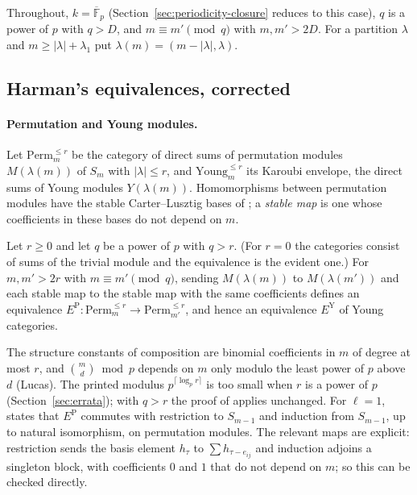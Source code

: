 Throughout, $k=\overline{\mathbb F}_p$ (Section~\ref{sec:periodicity-closure} reduces to this
case), $q$ is a power of $p$ with $q>D$, and $m\equiv m'\pmod q$ with $m,m'>2D$.  For a
partition $\lambda$ and $m\ge|\lambda|+\lambda_1$ put $\lambda(m)=(m-|\lambda|,\lambda)$.

\subsection{Harman's equivalences, corrected}\label{app:harman}

\paragraph{Permutation and Young modules.}  Let $\mathrm{Perm}^{\le r}_m$ be the category of
direct sums of permutation modules $M(\lambda(m))$ of $S_m$ with $|\lambda|\le r$, and
$\mathrm{Young}^{\le r}_m$ its Karoubi envelope, the direct sums of Young modules
$Y(\lambda(m))$.  Homomorphisms between permutation modules have the stable Carter--Lusztig
bases of \cite[\S2]{harman2015}; a \emph{stable map} is one whose coefficients in these bases do
not depend on $m$.

\begin{theorem}\label{thm:harman25}
Let $r\ge0$ and let $q$ be a power of $p$ with $q>r$.  (For $r=0$ the categories consist of
sums of the trivial module and the equivalence is the evident one.)  For $m,m'>2r$ with $m\equiv m'\pmod q$,
sending $M(\lambda(m))$ to $M(\lambda(m'))$ and each stable map to the stable map with the
same coefficients defines an equivalence
$E^{\mathrm{P}}\colon\mathrm{Perm}^{\le r}_m\to\mathrm{Perm}^{\le r}_{m'}$, and hence an
equivalence $E^{\mathrm Y}$ of Young categories.
\end{theorem}

The structure constants of composition are binomial coefficients in $m$ of degree at most
$r$, and $\binom md\bmod p$ depends on $m$ only modulo the least power of $p$ above $d$
(Lucas).  The printed modulus $p^{\lceil\log_pr\rceil}$ is too small when $r$ is a power of
$p$ (Section~\ref{sec:errata}); with $q>r$ the proof of \cite{harman2015} applies unchanged.
For $\ell=1$, \cite[Prop.~2.7]{harman2015} states that $E^{\mathrm P}$ commutes with
restriction to $S_{m-1}$ and induction from $S_{m-1}$, up to natural isomorphism, on permutation
modules.  The relevant maps are explicit: restriction sends the basis element $h_\tau$ to
$\sum h_{\tau-e_{ij}}$ and induction adjoins a singleton block, with coefficients $0$ and $1$
that do not depend on $m$; so this can be checked directly.

